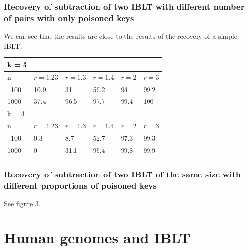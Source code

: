 \documentclass{article}
\begin{document}
\subsubsection{Recovery of subtraction of two IBLT with different number of pairs with only poisoned keys}
We can see that the results are close to the results of the recovery of a simple IBLT. 
\begin{center}
\begin{tabular}{l | l | l | l | l | l} \hline \hline k = 3 \\ \hline
    \hline n & $r = 1.23$ &  $r = 1.3$  &  $r = 1.4$ & $r = 2$ & $r = 3$\\ \hline
    \hline \ 100 & 10.9 & 31 & 59.2 & 94 & 99.2 \\ \hline 
    1000 & 37.4 & 96.5 & 97.7 & 99.4 & 100 \\ \hline
    \hline
    k = 4 \\
    \hline
    \hline n & $r = 1.23$ &  $r = 1.3$  &  $r = 1.4$ & $r = 2$ & $r = 3$\\ \hline
    \hline \ 100 & 0.3 & 8.7 & 52.7 & 97.3 & 99.3 \\ \hline 
    1000 & 0 & 31.1 & 99.4 & 99.8 & 99.9 \\ \hline
\end{tabular}
\end{center}


\subsubsection{Recovery of subtraction of two IBLT of the same size with different proportions of poisoned keys}
See figure 3.

\section{Human genomes and IBLT}
\end{document}
